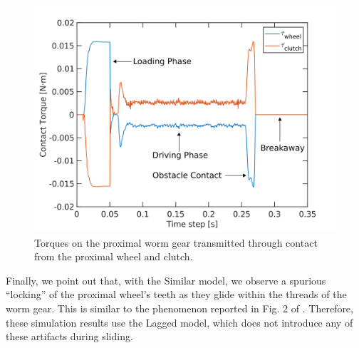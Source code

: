 \begin{figure}[!h]
    \centering
    \includegraphics[width=0.9\columnwidth]{figures/TestCases/BarrettHand/contact_torque_annotated.png}
    \caption{Torques on the proximal worm gear transmitted through contact from the proximal wheel and clutch.}
    \label{fig:barrett_torque}
\end{figure}

Finally, we point out that, with the Similar model, we observe a spurious
``locking'' of the proximal wheel's teeth as they glide within the threads of the
worm gear. This is similar to the phenomenon reported in Fig. 2 of
\cite{bib:horak2019}. Therefore, these simulation results use the Lagged model,
which does not introduce any of these artifacts during sliding.
